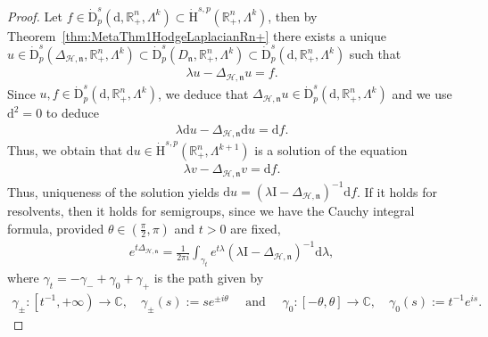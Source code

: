 \documentclass[AHL,Unicode,longabstracts,published]{cedram}
\newcommand{\bbR}{\mathbb{R}}
\newcommand{\bbC}{\mathbb{C}}
\newcommand{\rmH}{\mathrm{H}}%
\newcommand{\rmd}{\mathrm{d}}
\newcommand{\rmD}{\mathrm{D}}
\newcommand{\rmI}{\mathrm{I}}
\newcommand{\clH}{\mathcal{H}}
\newcommand{\fkn}{\mathfrak{n}}
\begin{document}
\begin{proof}
Let $f\in\dot{\rmD}^s_{p}(\rmd,\bbR^n_+,\Lambda^k)\subset \dot{\rmH}^{s,p}(\bbR^n_+,\Lambda^k)$, then by Theorem~\ref{thm:MetaThm1HodgeLaplacianRn+} there exists a unique $u\in \dot{\rmD}^s_{p}(\Delta_{\clH,\fkn},\bbR^n_+,\Lambda^k)\subset \dot{\rmD}^s_{p}(D_{\fkn},\bbR^n_+,\Lambda^k)\subset \dot{\rmD}^s_{p}(\rmd,\bbR^n_+,\Lambda^k)$ such that
\begin{align*}
\lambda u -\Delta_{\clH,\fkn} u =f .
\end{align*}
Since $u,f \in \dot{\rmD}^s_{p}(\rmd,\bbR^n_+,\Lambda^k)$, we deduce that $\Delta_{\clH,\fkn}u \in \dot{\rmD}^s_{p}(\rmd,\bbR^n_+,\Lambda^k)$ and we use $\rmd^2=0$ to deduce
\begin{align*}
\lambda \rmd u -\Delta_{\clH,\fkn} \rmd u =\rmd f .
\end{align*}
Thus, we obtain that $\rmd u \in \dot{\rmH}^{s,p}(\bbR^n_+,\Lambda^{k+1})$ is a solution of the equation
\begin{align*}
\lambda v -\Delta_{\clH,\fkn} v = \rmd f .
\end{align*}
Thus, uniqueness of the solution yields $\rmd u = (\lambda \rmI  - \Delta_{\clH,\fkn})^{-1}\rmd f$. If it holds for resolvents, then it holds for semigroups, since we have the Cauchy integral formula, provided $\theta\in(\frac{\pi}{2},\pi)$ and $t>0$ are fixed,
\begin{align*}
e^{t\Delta_{\clH,\fkn}}=\frac{1}{2 \pi i} \int_{\gamma_{t}} e^{t \lambda}(\lambda\rmI -\Delta_{\clH,\fkn})^{-1} \rmd\lambda,
\end{align*}
where $\gamma_{t}=-\gamma_-+\gamma_0+\gamma_+$ is the path given by
\begin{align*}
\gamma_{\pm}:\left[t^{-1}, +\infty\right) \rightarrow \bbC, \quad \gamma_{\pm}(s):=s e^{ \pm i \theta} \quad \text { and } \quad \gamma_0:[-\theta, \theta] \rightarrow \bbC, \quad \gamma_0(s):=t^{-1} e^{i s}.
\end{align*}
\end{proof}
\end{document}
